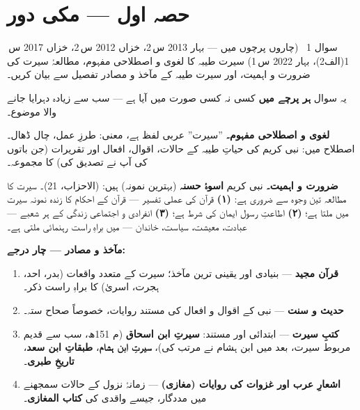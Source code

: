 
\section*{حصہ اول --- مکی دور}

\begin{sawal}{سوال \textenglish{1} \ \textnormal{\small(چاروں پرچوں میں --- بہار \textenglish{2013} س\,\textenglish{2}، خزاں \textenglish{2012} س\,\textenglish{2}، خزاں \textenglish{2017} س\,\textenglish{1}(الف\textenglish{2})، بہار \textenglish{2022} س\,\textenglish{1})}}
سیرت طیبہ کا لغوی و اصطلاحی مفہوم، مطالعۂ سیرت کی ضرورت و اہمیت، اور سیرت
طیبہ کے مآخذ و مصادر تفصیل سے بیان کریں۔
\end{sawal}

\begin{hal}
یہ سوال \textbf{ہر پرچے میں} کسی نہ کسی صورت میں آیا ہے --- سب سے زیادہ
دہرایا جانے والا موضوع۔

\medskip
\textbf{لغوی و اصطلاحی مفہوم۔} ''سیرت'' عربی لفظ ہے، معنی: طرزِ عمل، چال ڈھال۔
اصطلاح میں: نبی کریم \saw کی حیاتِ طیبہ کے حالات، اقوال، افعال اور تقریرات
(جن باتوں کی آپ \saw نے تصدیق کی) کا مجموعہ۔

\medskip
\textbf{ضرورت و اہمیت۔} نبی کریم \saw \textbf{اسوۂ حسنہ} (بہترین نمونہ) ہیں:
 (الاحزاب،
\textenglish{21})۔ سیرت کا مطالعہ تین وجوہ سے ضروری ہے: \textbf{(۱)} قرآن کی
عملی تفسیر --- قرآن کے احکام کا زندہ نمونہ سیرت میں ملتا ہے؛ \textbf{(۲)}
اطاعتِ رسول ایمان کی شرط ہے؛ \textbf{(۳)} انفرادی و اجتماعی زندگی کے ہر
شعبے --- عبادت، معیشت، سیاست، خاندان --- میں براہِ راست رہنمائی ملتی ہے۔

\medskip
\textbf{مآخذ و مصادر --- چار درجے:}
\begin{enumerate}\setlength{\itemsep}{2pt}
  \item \textbf{قرآن مجید} --- بنیادی اور یقینی ترین مآخذ؛ سیرت کے متعدد
        واقعات (بدر، احد، ہجرت، اسریٰ) کا براہِ راست ذکر۔
  \item \textbf{حدیث و سنت} --- نبی \saw کے اقوال و افعال کی مستند روایات،
        خصوصاً صحاح ستہ۔
  \item \textbf{کتبِ سیرت} --- ابتدائی اور مستند: \textbf{سیرتِ ابن اسحاق}
        (م \textenglish{151}ھ، سب سے قدیم مربوط سیرت، بعد میں ابن ہشام نے
        مرتب کی)، \textbf{سیرتِ ابن ہشام}، \textbf{طبقاتِ ابن سعد}،
        \textbf{تاریخِ طبری}۔
  \item \textbf{اشعارِ عرب اور غزوات کی روایات (مغازی)} --- زمانۂ نزول کے
        حالات سمجھنے میں مددگار، جیسے واقدی کی \textbf{کتاب المغازی}۔
\end{enumerate}
\end{hal}

